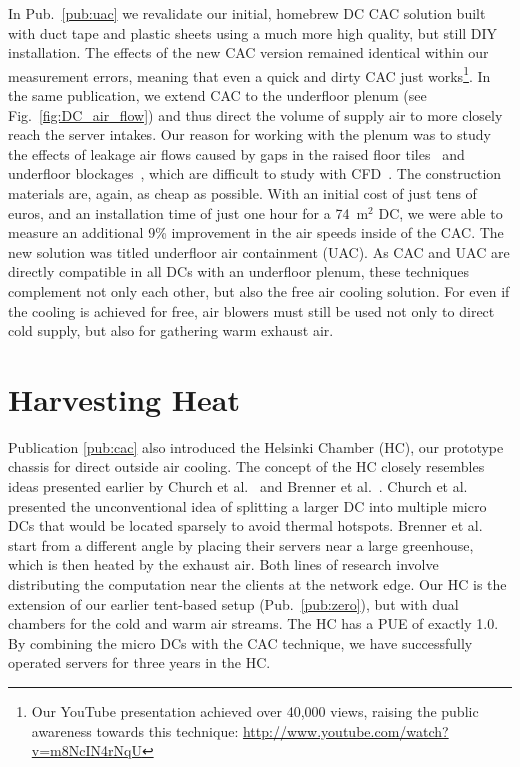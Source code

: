 \documentclass[officiallayout]{tktla}
\begin{document}
In Pub.~\ref{pub:uac} we revalidate our initial, homebrew DC CAC solution
built with duct tape and plastic sheets using a much more high quality, but
still DIY installation. The effects of the new CAC version remained identical
within our measurement errors, meaning that even a quick and dirty CAC just
works\footnote{Our YouTube presentation achieved over 40,000 views, raising
the public awareness towards this technique:
\url{http://www.youtube.com/watch?v=m8NcIN4rNqU}}. In the same publication, we
extend CAC to the underfloor plenum (see Fig.~\ref{fig:DC_air_flow}) and thus
direct the volume of supply air to more closely reach the server intakes.  Our
reason for working with the plenum was to study the effects of leakage air
flows caused by gaps in the raised floor tiles~\cite{Hannaford2006} and
underfloor blockages~\cite{VanGilder2005,Herrlin2006}, which are difficult to
study with CFD~\cite{Bhopte2006}. The construction materials are, again, as
cheap as possible. With an initial cost of just tens of euros, and an
installation time of just one hour for a 74~m$^2$ DC, we were able to measure
an additional 9\% improvement in the air speeds inside of the CAC. The new
solution was titled underfloor air containment (UAC). As CAC and UAC are
directly compatible in all DCs with an underfloor plenum, these techniques
complement not only each other, but also the free air cooling solution. For
even if the cooling is achieved for free, air blowers must still be used not
only to direct cold supply, but also for gathering warm exhaust air.



\section{Harvesting Heat}
\label{sec:harvesting}

Publication \ref{pub:cac} also introduced the Helsinki Chamber (HC), our
prototype chassis for direct outside air cooling. The concept of the HC
closely resembles ideas presented earlier by Church et al.~\cite{Church2008}
and Brenner et al.~\cite{Brenner,Brenner2009}. Church et al. presented the
unconventional idea of splitting a larger DC into multiple micro DCs that
would be located sparsely to avoid thermal hotspots. Brenner et al. start from
a different angle by placing their servers near a large greenhouse, which is
then heated by the exhaust air. Both lines of research involve distributing
the computation near the clients at the network edge. Our HC is the extension
of our earlier tent-based setup (Pub.~\ref{pub:zero}), but with dual chambers
for the cold and warm air streams. The HC has a PUE of exactly 1.0. By
combining the micro DCs with the CAC technique, we have successfully operated
servers for three years in the HC.
\end{document}
